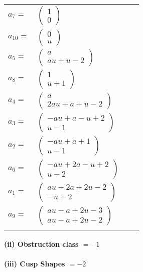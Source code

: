 \documentclass[1p]{elsarticle_modified}
\theoremstyle{definition}
\begin{document}
\begin{tabular}{m{7pt} m{180pt} m{7pt} m{180pt} }
\flushright $a_{7}=$&$\begin{pmatrix}1\\0\end{pmatrix}$ \\
\flushright $a_{10}=$&$\begin{pmatrix}0\\u\end{pmatrix}$ \\
\flushright $a_{5}=$&$\begin{pmatrix}a\\a u+u-2\end{pmatrix}$ \\
\flushright $a_{8}=$&$\begin{pmatrix}1\\u+1\end{pmatrix}$ \\
\flushright $a_{4}=$&$\begin{pmatrix}a\\2 a u+a+u-2\end{pmatrix}$ \\
\flushright $a_{3}=$&$\begin{pmatrix}- a u+a- u+2\\u-1\end{pmatrix}$ \\
\flushright $a_{2}=$&$\begin{pmatrix}- a u+a+1\\u-1\end{pmatrix}$ \\
\flushright $a_{6}=$&$\begin{pmatrix}- a u+2 a- u+2\\u-2\end{pmatrix}$ \\
\flushright $a_{1}=$&$\begin{pmatrix}a u-2 a+2 u-2\\- u+2\end{pmatrix}$ \\
\flushright $a_{9}=$&$\begin{pmatrix}a u- a+2 u-3\\a u- a+2 u-2\end{pmatrix}$\\&\end{tabular}
\flushleft \textbf{(ii) Obstruction class $= -1$}\\~\\
\flushleft \textbf{(iii) Cusp Shapes $= -2$}\\~\\
\end{document}
